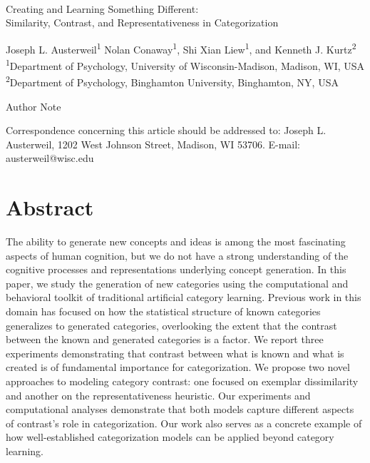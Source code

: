 \documentclass[12pt]{article}
\begin{document}
\begin{center}
\hfill
\\[1in]

Creating and Learning Something Different: \\
Similarity, Contrast, and Representativeness in Categorization


\vfill
Joseph L. Austerweil\textsuperscript{1}
Nolan Conaway\textsuperscript{1}, 
Shi Xian Liew\textsuperscript{1},
and Kenneth J. Kurtz\textsuperscript{2}
\\[\baselineskip]
\textsuperscript{1}Department of Psychology, University of Wisconsin-Madison, Madison, WI, USA
\textsuperscript{2}Department of Psychology, Binghamton University, Binghamton, NY, USA
\\[1in]

\vfill

Author Note

Correspondence concerning this article should be addressed to: 
Joseph L. Austerweil, 1202 West Johnson Street, Madison, WI 53706.
E-mail: austerweil@wisc.edu

\end{center}
\clearpage


\doublespacing
\section*{Abstract}
The ability to generate new concepts and ideas is among the most fascinating
aspects of human cognition, but we do not have a strong understanding of the
cognitive processes and representations underlying concept generation. In this
paper, we study the generation of new categories using the computational and
behavioral toolkit of traditional artificial category learning. Previous work in
this domain has focused on how the statistical structure of known categories
generalizes to generated categories, overlooking the extent that the contrast
between the known and generated categories is a factor. We report three
experiments demonstrating that contrast between what is known and what is
created is of fundamental importance for categorization. We propose two novel
approaches to modeling category contrast: one focused on exemplar dissimilarity
and another on the representativeness heuristic. Our experiments and
computational analyses demonstrate that both models capture different aspects of
contrast's role in categorization. Our work also serves as a concrete example of
how well-established categorization models can be applied beyond category learning.
\end{document}
